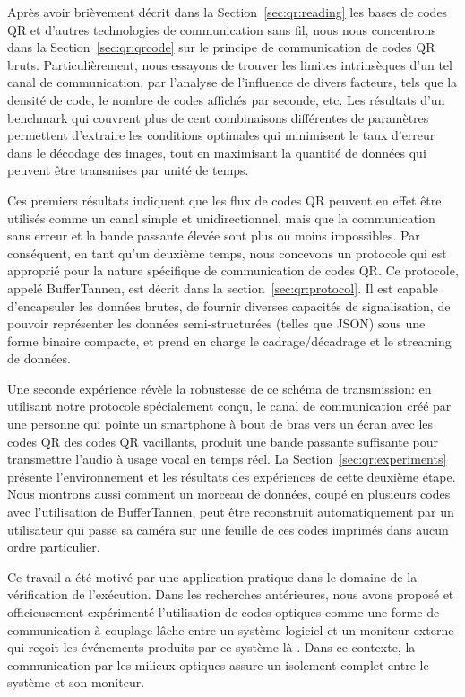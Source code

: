 Après avoir brièvement décrit dans la Section~\ref{sec:qr:reading} les bases de codes QR et d'autres technologies de communication sans fil, nous nous concentrons dans la Section~\ref{sec:qr:qrcode} sur le principe de communication de codes QR bruts. Particulièrement, nous essayons de trouver les limites intrinsèques d'un tel canal de communication, par l'analyse de l'influence de divers facteurs, tels que la densité de code, le nombre de codes affichés par seconde, etc. Les résultats d'un benchmark qui couvrent plus de cent combinaisons différentes de paramètres permettent d'extraire les conditions optimales qui minimisent le taux d'erreur dans le décodage des images, tout en maximisant la quantité de données qui peuvent être transmises par unité de temps.

Ces premiers résultats indiquent que les flux de codes QR peuvent en effet être utilisés comme un canal simple et unidirectionnel, mais que la communication sans erreur et la bande passante élevée sont plus ou moins impossibles. Par conséquent, en tant qu'un deuxième temps, nous concevons un protocole qui est approprié pour la nature spécifique de communication de codes QR. Ce protocole, appelé BufferTannen, est décrit dans la section~\ref{sec:qr:protocol}. Il est capable d'encapsuler les données brutes, de fournir diverses capacités de signalisation, de pouvoir représenter les données semi-structurées (telles que JSON) sous une forme binaire compacte, et prend en charge le cadrage/décadrage et le streaming de données.

Une seconde expérience révèle la robustesse de ce schéma de transmission: en utilisant notre protocole spécialement conçu, le canal de communication créé par une personne qui pointe un smartphone à bout de bras vers un écran avec les codes QR des codes QR vacillants, produit une bande passante suffisante pour transmettre l'audio à usage vocal en temps réel. La Section~\ref{sec:qr:experiments} présente l'environnement et les résultats des expériences de cette deuxième étape. Nous montrons aussi comment un morceau de données, coupé en plusieurs codes avec l'utilisation de BufferTannen, peut être reconstruit automatiquement par un utilisateur qui passe sa caméra sur une feuille de ces codes imprimés dans aucun ordre particulier.

Ce travail a été motivé par une application pratique dans le domaine de la vérification de l'exécution. Dans les recherches antérieures, nous avons proposé et officieusement expérimenté l'utilisation de codes optiques comme une forme de communication à couplage lâche entre un système logiciel et un moniteur externe qui reçoit les événements produits par ce système-là \citep{DBLP_conf/rv/LavoieLVGH14}. Dans ce contexte, la communication par les milieux optiques assure un isolement complet entre le système et son moniteur.

